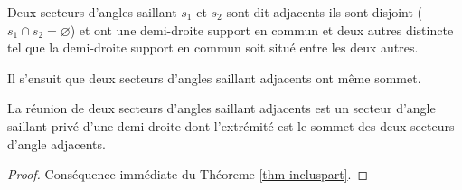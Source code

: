 \begin{defi}
Deux secteurs d'angles saillant $s_1$ et $s_2$ sont dit adjacents \ssi ils sont disjoint ($s_1 \cap s_2 = \varnothing$) et ont une demi-droite support en commun et deux autres distincte tel que la demi-droite support en commun soit situé entre les deux autres. 
\end{defi}
\begin{rema}
    Il s'ensuit que deux secteurs d'angles saillant adjacents ont même sommet. 
\end{rema}
\begin{cor}
    La réunion de deux secteurs d'angles saillant adjacents est un secteur d'angle saillant privé d'une demi-droite dont l'extrémité est le sommet des deux secteurs d'angle adjacents.
\begin{proof}
    Conséquence immédiate du Théoreme \ref{thm-incluspart}.
\end{proof}
\end{cor}
